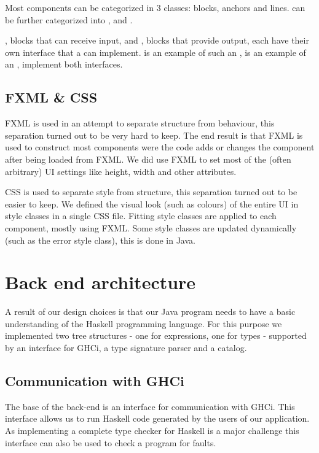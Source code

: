 Most components can be categorized in 3 classes: blocks, anchors and lines.
 can be further categorized into ,  and .

, blocks that can receive input, and , blocks that provide output, each have their own interface that a  can implement.  is an example of such an ,  is an example of an ,  implement both interfaces.


\subsection{FXML \& CSS}
FXML is used in an attempt to separate structure from behaviour, this separation turned out to be very hard to keep. The end result is that FXML is used to construct most components were the code adds or changes the component after being loaded from FXML. We did use FXML to set most of the (often arbitrary) UI settings like height, width and other attributes.

CSS is used to separate style from structure, this separation turned out to be easier to keep. We defined the visual look (such as colours) of the entire UI in style classes in a single CSS file. Fitting style classes are applied to each component, mostly using FXML. Some style classes are updated dynamically (such as the error style class), this is done in Java.

\section{Back end architecture}

A result of our design choices is that our Java program needs to have a basic understanding of the Haskell programming
language. For this purpose we implemented two tree structures - one for expressions, one for types - supported by an
interface for GHCi, a type signature parser and a catalog.

\subsection{Communication with GHCi}
\label{GHCi}

The base of the back-end is an interface for communication with GHCi. This interface allows us to run Haskell code
generated by the users of our application. As implementing a complete type checker for Haskell is a major challenge this
interface can also be used to check a program for faults.

